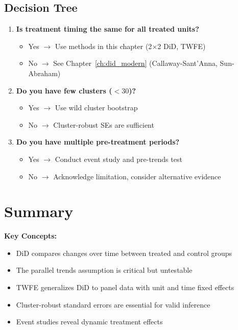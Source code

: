 \subsection{Decision Tree}

\begin{enumerate}
    \item \textbf{Is treatment timing the same for all treated units?}
    \begin{itemize}
        \item Yes $\to$ Use methods in this chapter (2$\times$2 DiD, TWFE)
        \item No $\to$ See Chapter~\ref{ch:did_modern} (Callaway-Sant'Anna, Sun-Abraham)
    \end{itemize}
    \item \textbf{Do you have few clusters ($<30$)?}
    \begin{itemize}
        \item Yes $\to$ Use wild cluster bootstrap
        \item No $\to$ Cluster-robust SEs are sufficient
    \end{itemize}
    \item \textbf{Do you have multiple pre-treatment periods?}
    \begin{itemize}
        \item Yes $\to$ Conduct event study and pre-trends test
        \item No $\to$ Acknowledge limitation, consider alternative evidence
    \end{itemize}
\end{enumerate}

\section{Summary}
\label{sec:did_summary}

\textbf{Key Concepts:}
\begin{itemize}
    \item DiD compares changes over time between treated and control groups
    \item The parallel trends assumption is critical but untestable
    \item TWFE generalizes DiD to panel data with unit and time fixed effects
    \item Cluster-robust standard errors are essential for valid inference
    \item Event studies reveal dynamic treatment effects
\end{itemize}

